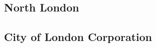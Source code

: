 \documentclass[a4paper,openany]{book}
\begin{document}
\begin{resultsiii}

%
%
%
%
%
%
%
%
%

\section{North London}

\subsection*{City of London Corporation}


\end{resultsiii}
\end{document}
